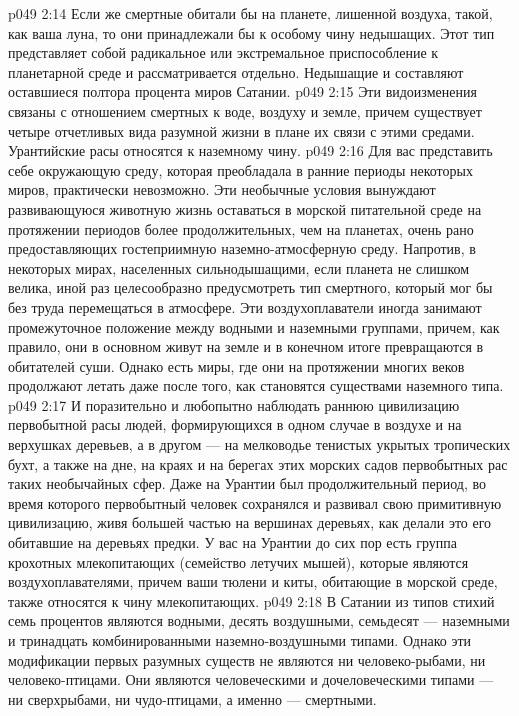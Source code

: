 \vs p049 2:14 Если же смертные обитали бы на планете, лишенной воздуха, такой, как ваша луна, то они принадлежали бы к особому чину недышащих. Этот тип представляет собой радикальное или экстремальное приспособление к планетарной среде и рассматривается отдельно. Недышащие и составляют оставшиеся полтора процента миров Сатании.
\vs p049 2:15 \pc {}\bibnobreakspace {} Эти видоизменения связаны с отношением смертных к воде, воздуху и земле, причем существует четыре отчетливых вида разумной жизни в плане их связи с этими средами. Урантийские расы относятся к наземному чину.
\vs p049 2:16 Для вас представить себе окружающую среду, которая преобладала в ранние периоды некоторых миров, практически невозможно. Эти необычные условия вынуждают развивающуюся животную жизнь оставаться в морской питательной среде на протяжении периодов более продолжительных, чем на планетах, очень рано предоставляющих гостеприимную наземно\hyp{}атмосферную среду. Напротив, в некоторых мирах, населенных сильнодышащими, если планета не слишком велика, иной раз целесообразно предусмотреть тип смертного, который мог бы без труда перемещаться в атмосфере. Эти воздухоплаватели иногда занимают промежуточное положение между водными и наземными группами, причем, как правило, они в основном живут на земле и в конечном итоге превращаются в обитателей суши. Однако есть миры, где они на протяжении многих веков продолжают летать даже после того, как становятся существами наземного типа.
\vs p049 2:17 И поразительно и любопытно наблюдать раннюю цивилизацию первобытной расы людей, формирующихся в одном случае в воздухе и на верхушках деревьев, а в другом --- на мелководье тенистых укрытых тропических бухт, а также на дне, на краях и на берегах этих морских садов первобытных рас таких необычайных сфер. Даже на Урантии был продолжительный период, во время которого первобытный человек сохранялся и развивал свою примитивную цивилизацию, живя большей частью на вершинах деревьях, как делали это его обитавшие на деревьях предки. У вас на Урантии до сих пор есть группа крохотных млекопитающих (семейство летучих мышей), которые являются воздухоплавателями, причем ваши тюлени и киты, обитающие в морской среде, также относятся к чину млекопитающих.
\vs p049 2:18 В Сатании из типов стихий семь процентов являются водными, десять воздушными, семьдесят --- наземными и тринадцать комбинированными наземно\hyp{}воздушными типами. Однако эти модификации первых разумных существ не являются ни человеко\hyp{}рыбами, ни человеко\hyp{}птицами. Они являются человеческими и дочеловеческими типами --- ни сверхрыбами, ни чудо\hyp{}птицами, а именно --- смертными.
